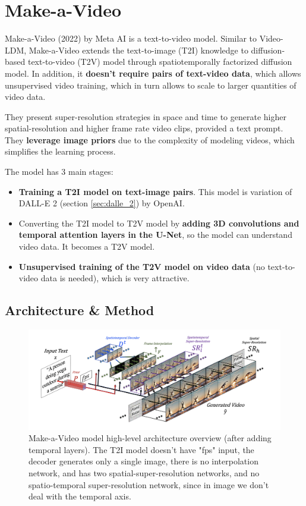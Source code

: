 \section{Make-a-Video}
\label{sec:make_a_video}

Make-a-Video \cite{make_a_video} (2022) by Meta AI is a text-to-video model. Similar to Video-LDM, Make-a-Video extends the text-to-image (T2I) knowledge to diffusion-based text-to-video (T2V) model through spatiotemporally factorized diffusion model. In addition, it \textbf{doesn't require pairs of text-video data}, which allows unsupervised video training, which in turn allows to scale to larger quantities of video data.

They present super-resolution strategies in space and time to generate higher spatial-resolution and higher frame rate video clips, provided a text prompt. They \textbf{leverage image priors} due to the complexity of modeling videos, which simplifies the learning process.

The model has 3 main stages:

\begin{itemize}
    \item \textbf{Training a T2I model on text-image pairs}. This model is variation of DALL-E 2 \cite{dalle_2} (section \ref{sec:dalle_2}) by OpenAI.
    \item Converting the T2I model to T2V model by \textbf{adding 3D convolutions and temporal attention layers in the U-Net}, so the model can understand video data. It becomes a T2V model.
    \item \textbf{Unsupervised training of the T2V model on video data} (no text-to-video data is needed), which is very attractive.
\end{itemize}



\subsection{Architecture \& Method}

\begin{figure}
    \centering
    \includegraphics[width=1\textwidth]{images/make_a_video/overview.png}
    \caption{Make-a-Video model high-level architecture overview (after adding temporal layers). The T2I model doesn't have "fps" input, the decoder generates only a single image, there is no interpolation network, and has two spatial-super-resolution networks, and no spatio-temporal super-resolution network, since in image we don't deal with the temporal axis.}
    \label{fig:make_a_video_overview}
\end{figure}


